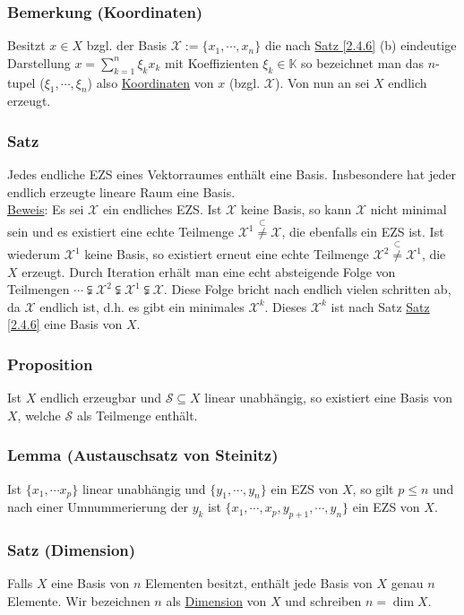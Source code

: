 \subsubsection{Bemerkung (Koordinaten)}
Besitzt $x\in X$ bzgl. der Basis $\mathcal{X}:=\{x_1,\cdots ,x_n\}$ die nach \hyperref[2.4.6]{Satz \ref*{2.4.6}} (b) eindeutige Darstellung $x=\sum_{k=1}^n \xi _k x_k$ mit Koeffizienten $\xi _k \in \mathbb{K}$ so bezeichnet man das $n$-tupel ($\xi _1,\cdots ,\xi _n$) also \underline{Koordinaten} von $x$ (bzgl. $\mathcal{X}$).  Von nun an sei $X$ endlich erzeugt.
\subsubsection{Satz}
\label{2.4.8}
Jedes endliche EZS eines Vektorraumes enthält eine Basis.  Insbesondere hat jeder endlich erzeugte lineare Raum eine Basis.\\
\underline{Beweis}:
Es sei $\mathcal{X}$ ein endliches EZS.  Ist $\mathcal{X}$ keine Basis, so kann $\mathcal{X}$ nicht minimal sein und es existiert eine echte Teilmenge $\mathcal{X}^1 \stackrel{\subset}{\not=} \mathcal{X}$, die ebenfalls ein EZS ist.  Ist wiederum $\mathcal{X}^1$ keine Basis, so existiert erneut eine echte Teilmenge $\mathcal{X}^2 \stackrel{\subset}{\not=} \mathcal{X}^1$, die $X$ erzeugt.  Durch Iteration erhält man eine echt absteigende Folge von Teilmengen $\cdots \subsetneqq \mathcal{X}^2 \subsetneqq \mathcal{X}^1 \subsetneqq \mathcal{X}$.  Diese Folge bricht nach endlich vielen schritten ab, da $\mathcal{X}$ endlich ist, d.h. es gibt ein minimales $\mathcal{X}^k$.  Dieses $\mathcal{X}^k$ ist nach Satz \hyperref[2.4.6]{Satz \ref*{2.4.6}} eine Basis von $X$.
\subsubsection{Proposition}
\label{2.4.9}
Ist $X$ endlich erzeugbar und $\mathcal{S}\subseteq X$ linear unabhängig, so existiert eine Basis von $X$, welche $\mathcal{S}$ als Teilmenge enthält.
\subsubsection{Lemma (Austauschsatz von Steinitz)}
\label{Austauschsatz}
Ist $\{x_1,\cdots x_p\}$ linear unabhängig und $\{y_1,\cdots ,y_n\}$ ein EZS von $X$, so gilt $p\leq n$ und nach einer Umnummerierung der $y_k$ ist $\{x_1,\cdots ,x_p,y_{p+1},\cdots ,y_n\}$ ein EZS von $X$.
\subsubsection{Satz (Dimension)}
\label{2.4.11}
Falls $X$ eine Basis von $n$ Elementen besitzt, enthält jede Basis von $X$ genau $n$ Elemente.  Wir bezeichnen $n$ als \underline{Dimension} von $X$ und schreiben $n=\dim X$.
